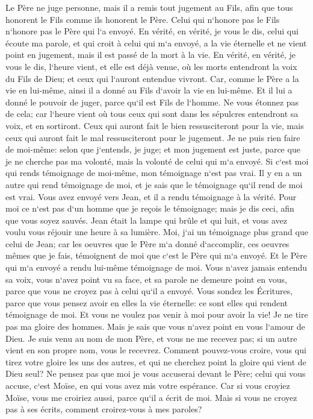 \verse Le Père ne juge personne, mais il a remis tout jugement au Fils, 
\verse afin que tous honorent le Fils comme ils honorent le Père. Celui qui n`honore pas le Fils n`honore pas le Père qui l`a envoyé. 
\verse En vérité, en vérité, je vous le dis, celui qui écoute ma parole, et qui croit à celui qui m`a envoyé, a la vie éternelle et ne vient point en jugement, mais il est passé de la mort à la vie. 
\verse En vérité, en vérité, je vous le dis, l`heure vient, et elle est déjà venue, où les morts entendront la voix du Fils de Dieu; et ceux qui l`auront entendue vivront. 
\verse Car, comme le Père a la vie en lui-même, ainsi il a donné au Fils d`avoir la vie en lui-même. 
\verse Et il lui a donné le pouvoir de juger, parce qu`il est Fils de l`homme. 
\verse Ne vous étonnez pas de cela; car l`heure vient où tous ceux qui sont dans les sépulcres entendront sa voix, et en sortiront. 
\verse Ceux qui auront fait le bien ressusciteront pour la vie, mais ceux qui auront fait le mal ressusciteront pour le jugement. 
\verse Je ne puis rien faire de moi-même: selon que j`entends, je juge; et mon jugement est juste, parce que je ne cherche pas ma volonté, mais la volonté de celui qui m`a envoyé. 
\verse Si c`est moi qui rends témoignage de moi-même, mon témoignage n`est pas vrai. 
\verse Il y en a un autre qui rend témoignage de moi, et je sais que le témoignage qu`il rend de moi est vrai. 
\verse Vous avez envoyé vers Jean, et il a rendu témoignage à la vérité. 
\verse Pour moi ce n`est pas d`un homme que je reçois le témoignage; mais je dis ceci, afin que vous soyez sauvés. 
\verse Jean était la lampe qui brûle et qui luit, et vous avez voulu vous réjouir une heure à sa lumière. 
\verse Moi, j`ai un témoignage plus grand que celui de Jean; car les oeuvres que le Père m`a donné d`accomplir, ces oeuvres mêmes que je fais, témoignent de moi que c`est le Père qui m`a envoyé. 
\verse Et le Père qui m`a envoyé a rendu lui-même témoignage de moi. Vous n`avez jamais entendu sa voix, vous n`avez point vu sa face, 
\verse et sa parole ne demeure point en vous, parce que vous ne croyez pas à celui qu`il a envoyé. 
\verse Vous sondez les Écritures, parce que vous pensez avoir en elles la vie éternelle: ce sont elles qui rendent témoignage de moi. 
\verse Et vous ne voulez pas venir à moi pour avoir la vie! 
\verse Je ne tire pas ma gloire des hommes. 
\verse Mais je sais que vous n`avez point en vous l`amour de Dieu. 
\verse Je suis venu au nom de mon Père, et vous ne me recevez pas; si un autre vient en son propre nom, vous le recevrez. 
\verse Comment pouvez-vous croire, vous qui tirez votre gloire les uns des autres, et qui ne cherchez point la gloire qui vient de Dieu seul? 
\verse Ne pensez pas que moi je vous accuserai devant le Père; celui qui vous accuse, c`est Moïse, en qui vous avez mis votre espérance. 
\verse Car si vous croyiez Moïse, vous me croiriez aussi, parce qu`il a écrit de moi. 
\verse Mais si vous ne croyez pas à ses écrits, comment croirez-vous à mes paroles? 

